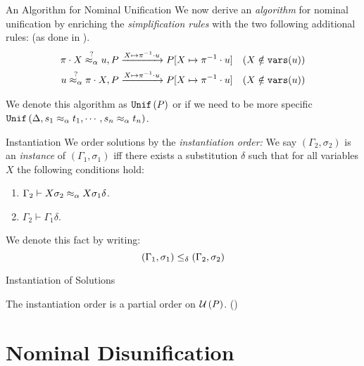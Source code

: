 \documentclass{beamer}
\begin{document}
    \begin{frame}{An Algorithm for Nominal Unification}
        We now derive an \textit{algorithm} for nominal unification by enriching the \textit{simplification rules} with the two following additional rules: (as done in \cite{gabbay:nomr-jv}).
        \begin{align*}
            \pi \cdot X \overset{?}{\mathrel{\approx_\alpha}} u, P & \xrightarrow{X \mapsto \pi^{-1} \cdot u}{P[X \mapsto \pi^{-1} \cdot u ]} \quad (X \notin \mathtt{vars}(u)) \\
            u \overset{?}{\mathrel{\approx_\alpha}} \pi \cdot X, P & \xrightarrow{X \mapsto \pi^{-1} \cdot u}{P[X \mapsto \pi^{-1} \cdot u ]} \quad (X \notin \mathtt{vars}(u))
        \end{align*}

        We denote this algorithm as $\mathtt{Unif}\left(P\right)$ or if we need to be more specific $\mathtt{Unif}\left(\Delta, s_1 \mathrel{\approx_\alpha} t_1, \cdots, s_n \mathrel{\approx_\alpha} t_n\right)$.
    \end{frame}

    \begin{frame}{Instantiation}
        We order solutions by the \textit{instantiation order:} We say $(\Gamma_2, \sigma_2)$ is an \textit{instance} of $(\Gamma_1, \sigma_1)$ iff there exists a substitution $\delta$ such that for all variables $X$ the following conditions hold:
        \begin{enumerate}
            \item $\Gamma_2 \vdash X \sigma_2 \mathrel{\approx_\alpha} X \sigma_1 \delta$.
            \item $\Gamma_2 \vdash \Gamma_1 \delta$.
        \end{enumerate}

        We denote this fact by writing:
        $$(\Gamma_1, \sigma_1) \leq_\delta (\Gamma_2, \sigma_2)$$
    \end{frame}

    \begin{frame}{Instantiation of Solutions}
        \begin{lemma}
            The instantiation order is a partial order on $\mathcal{U}\left(P\right)$. (\cite{gabbay:nomr-jv})
        \end{lemma}
    \end{frame}




    \section{Nominal Disunification}
\end{document}
